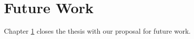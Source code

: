 \chapter{Future Work}
\label{chap:future-work}


\begin{chapabstract}

Chapter \ref{chap:future-work} closes the thesis with our proposal for future work. 

\end{chapabstract}